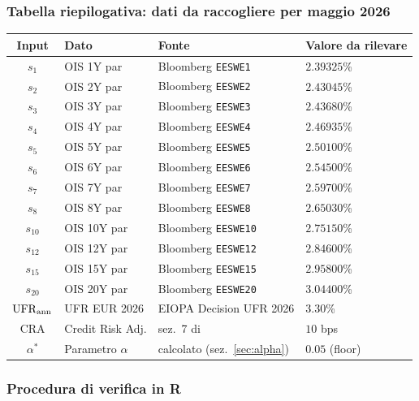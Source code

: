 \documentclass[11pt,a4paper]{article}
\theoremstyle{plain}
\theoremstyle{definition}
\theoremstyle{remark}
\newcommand{\UFR}{\mathrm{UFR}}
\newcommand{\CRA}{\mathrm{CRA}}
\begin{document}
\subsubsection*{Tabella riepilogativa: dati da raccogliere per maggio 2026}

\begin{center}\small
\renewcommand{\arraystretch}{1.3}
\begin{tabular}{clp{4cm}l}
\toprule
\textbf{Input} & \textbf{Dato} & \textbf{Fonte} & \textbf{Valore da rilevare} \\
\midrule
$s_1$  & OIS 1Y  par & Bloomberg \texttt{EESWE1}  & $2.39325$\% \\
$s_2$  & OIS 2Y  par & Bloomberg \texttt{EESWE2}  & $2.43045$\% \\
$s_3$  & OIS 3Y  par & Bloomberg \texttt{EESWE3}  & $2.43680$\% \\
$s_4$  & OIS 4Y  par & Bloomberg \texttt{EESWE4}  & $2.46935$\% \\
$s_5$  & OIS 5Y  par & Bloomberg \texttt{EESWE5}  & $2.50100$\% \\
$s_6$  & OIS 6Y  par & Bloomberg \texttt{EESWE6}  & $2.54500$\% \\
$s_7$  & OIS 7Y  par & Bloomberg \texttt{EESWE7}  & $2.59700$\% \\
$s_8$  & OIS 8Y  par & Bloomberg \texttt{EESWE8}  & $2.65030$\% \\
$s_{10}$ & OIS 10Y par & Bloomberg \texttt{EESWE10} & $2.75150$\% \\
$s_{12}$ & OIS 12Y par & Bloomberg \texttt{EESWE12} & $2.84600$\% \\
$s_{15}$ & OIS 15Y par & Bloomberg \texttt{EESWE15} & $2.95800$\% \\
$s_{20}$ & OIS 20Y par & Bloomberg \texttt{EESWE20} & $3.04400$\% \\
\midrule
$\UFR_{\rm ann}$ & UFR EUR 2026 & EIOPA Decision UFR 2026  & $3.30$\% \\
$\CRA$ & Credit Risk Adj. & sez.~7 di~\cite{eiopa2025} & $10$ bps \\
$\alpha^*$ & Parametro $\alpha$ & calcolato (sez.~\ref{sec:alpha}) & $0.05$ (floor) \\
\bottomrule
\end{tabular}
\end{center}

\subsubsection*{Procedura di verifica in R}
\end{document}
